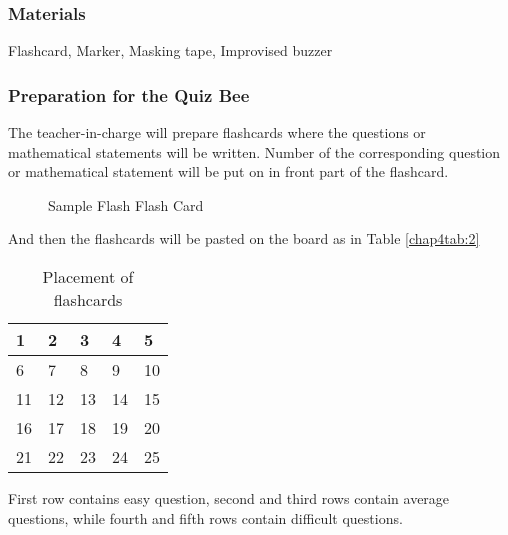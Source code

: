 \subsubsection*{Materials}
Flashcard, Marker, Masking tape, Improvised buzzer
\subsubsection*{Preparation for the Quiz Bee}
The teacher-in-charge will prepare flashcards where the questions or mathematical statements will
be written. Number of the corresponding question or mathematical statement will be put on in front
part of the flashcard.
\begin{figure}[!h]
\centering
\caption{Sample Flash Flash Card}
\qquad
{}%
\end{figure}
And then the flashcards will be pasted on the board as in Table \eqref{chap4tab:2}
\begin{table}[!h]
\centering
\caption{Placement of flashcards}
\begin{tabular}{|l|l|l|l|l|}
\hline
1 & 2 & 3 & 4 & 5\\ \hline
6 & 7 & 8 & 9 & 10\\ \hline
11 & 12 & 13 & 14 & 15\\ \hline
16 & 17 & 18 & 19 & 20\\ \hline
21 & 22 & 23 & 24 & 25\\ \hline
\end{tabular}
\end{table}
First row contains easy question, second and third rows contain average questions, while fourth and
fifth rows contain difficult questions.
